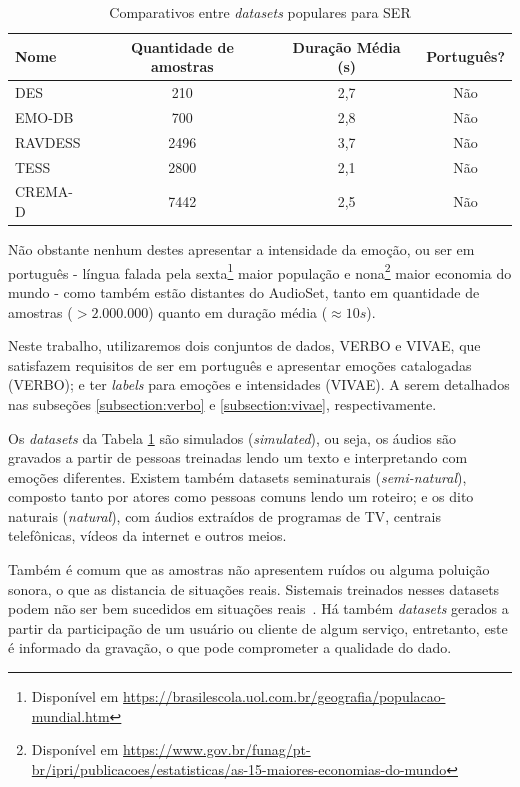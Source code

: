 \begin{table}[]
\centering
\caption{Comparativos entre \textit{datasets} populares para \acrshort{SER}}
    \begin{tabular}{|l|c|c|c|}
    \hline
        Nome & Quantidade de amostras & Duração Média (s) & Português?  \\ \hline
        DES  & 210 & 2,7 & Não  \\ \hline
        EMO-DB  & 700 & 2,8 & Não  \\ \hline
        RAVDESS  & 2496 & 3,7 & Não  \\ \hline
        TESS  & 2800 & 2,1 & Não  \\ \hline
        CREMA-D  & 7442 & 2,5 & Não  \\ \hline
    \end{tabular}\label{table:comparativodbs}
\end{table}

Não obstante nenhum destes apresentar a intensidade da emoção, ou ser em português - língua falada pela sexta\footnote{Disponível em \url{https://brasilescola.uol.com.br/geografia/populacao-mundial.htm}} maior população e nona\footnote{Disponível em \url{https://www.gov.br/funag/pt-br/ipri/publicacoes/estatisticas/as-15-maiores-economias-do-mundo}} maior economia do mundo - como também estão distantes do AudioSet, tanto em quantidade de amostras ($> 2.000.000$) quanto em duração média ($\approx 10s$).

Neste trabalho, utilizaremos dois conjuntos de dados, VERBO e VIVAE, que satisfazem requisitos de ser em português e apresentar emoções catalogadas (VERBO); e ter \textit{labels} para emoções e intensidades (VIVAE). A serem detalhados nas subseções \ref{subsection:verbo} e \ref{subsection:vivae}, respectivamente.

Os \textit{datasets} da Tabela \ref{table:comparativodbs} são simulados (\textit{simulated}), ou seja, os áudios são gravados a partir de pessoas treinadas lendo um texto e interpretando com emoções diferentes. Existem também datasets seminaturais (\textit{semi-natural}), composto tanto por atores como pessoas comuns lendo um roteiro; e os dito naturais (\textit{natural}), com áudios extraídos de programas de TV, centrais telefônicas, vídeos da internet e outros meios.

Também é comum que as amostras não apresentem ruídos ou alguma poluição sonora, o que as distancia de situações reais. Sistemais treinados nesses datasets podem não ser bem sucedidos em situações reais~\cite{32}. Há também \textit{datasets} gerados a partir da participação de um usuário ou cliente de algum serviço, entretanto, este é informado da gravação, o que pode comprometer a qualidade do dado.

